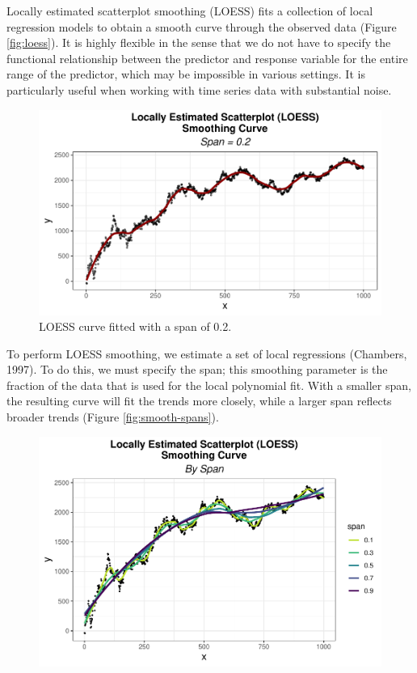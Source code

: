 \documentclass[12pt,twoside]{smiththesis}
\begin{document}
Locally estimated scatterplot smoothing (LOESS) fits a collection of local regression models to obtain a smooth curve through the observed data (Figure \ref{fig:loess}). It is highly flexible in the sense that we do not have to specify the functional relationship between the predictor and response variable for the entire range of the predictor, which may be impossible in various settings. It is particularly useful when working with time series data with substantial noise.
\begin{figure}

{\centering \includegraphics[width=1\linewidth]{thesis_files/figure-latex/unnamed-chunk-31-1} 

}

\caption{\label{fig:loess}LOESS curve fitted with  a span of 0.2. }\label{fig:unnamed-chunk-31}
\end{figure}
To perform LOESS smoothing, we estimate a set of local regressions (Chambers, 1997). To do this, we must specify the span; this smoothing parameter is the fraction of the data that is used for the local polynomial fit. With a smaller span, the resulting curve will fit the trends more closely, while a larger span reflects broader trends (Figure \ref{fig:smooth-spans}).
\begin{figure}

{\centering \includegraphics[width=1\linewidth]{thesis_files/figure-latex/unnamed-chunk-32-1} 

}

\caption{\label{fig:smooth-spans}}\label{fig:unnamed-chunk-32}
\end{figure}
\end{document}
